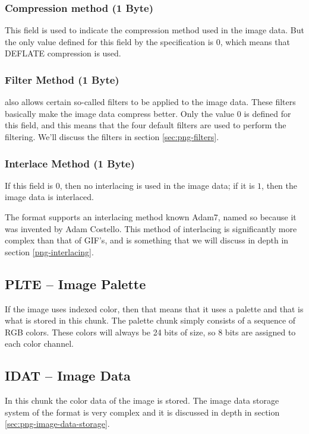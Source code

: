 \subsubsection*{Compression method (1 Byte)}

This field is used to indicate the compression method used in the
image data. But the only value defined for this field by the \png
specification is $0$, which means that DEFLATE compression is used.

\subsubsection*{Filter Method (1 Byte)}

\png also allows certain so-called filters to be applied to the image
data. These filters basically make the image data compress
better. Only the value $0$ is defined for this field, and this means
that the four default filters are used to perform the filtering. We'll
discuss the filters in section \ref{sec:png-filters}.

\subsubsection*{Interlace Method (1 Byte)}

If this field is $0$, then no interlacing is used in the image data; if it
is $1$, then the image data is interlaced.

The \png format supports an interlacing method known Adam7, named so
because it was invented by Adam Costello. This method of interlacing
is significantly more complex than that of GIF's, and is something
that we will discuss in depth in section \ref{png-interlacing}.

\subsection{PLTE -- Image Palette}

If the image uses indexed color, then that means that it uses a
palette and that is what is stored in this chunk. The palette chunk
simply consists of a sequence of RGB colors. These colors will always be
24 bits of size, so 8 bits are assigned to each color channel.

\subsection{IDAT -- Image Data}

In this chunk the color data of the image is stored. The image data
storage system of the \png format is very complex and it is discussed
in depth in section \ref{sec:png-image-data-storage}.

